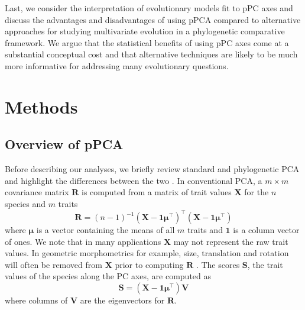 \documentclass[a4paper,11pt]{article}
\begin{document}
Last, we consider the interpretation of evolutionary models fit to pPC axes and discuss the advantages and disadvantages of using pPCA compared to alternative approaches for studying multivariate evolution in a phylogenetic comparative framework. We argue that the statistical benefits of using pPC axes come at a substantial conceptual cost and that alternative techniques are likely to be much more informative for addressing many evolutionary questions.

\section{Methods}
\subsection{Overview of pPCA}
Before describing our analyses, we briefly review standard and phylogenetic PCA and highlight the differences between the two \citep[see][for a more detailed treatment]{Polly2013}. In conventional PCA, a $m \times m$ covariance matrix $\mathbf{R}$ is computed from a matrix of trait values $\mathbf{X}$ for the $n$ species and $m$ traits
\begin{equation}\label{eq:rpca}
\mathbf{R} = (n-1)^{-1}(\mathbf{X} - \mathbf{1}\boldsymbol{\mu}^\intercal)^\intercal (\mathbf{X} - \mathbf{1}\boldsymbol{\mu}^\intercal)
\end{equation}
where $\boldsymbol{\mu}$ is a vector containing the means of all $m$ traits and $\mathbf{1}$ is a column vector of ones. We note that in many applications $\mathbf{X}$ may not represent the raw trait values. In geometric morphometrics for example, size, translation and rotation will often be removed from $\mathbf{X}$ prior to computing $\mathbf{R}$ \citep{RohlfSlice, Bookstein1997}. The scores $\mathbf{S}$, the trait values of the species along the PC axes, are computed as
\begin{equation}\label{eq:Spca}
\mathbf{S}=(\mathbf{X} - \mathbf{1}\boldsymbol{\mu}^\intercal)\mathbf{V}
\end{equation}
where columns of $\mathbf{V}$ are the eigenvectors for $\mathbf{R}$.
\end{document}
